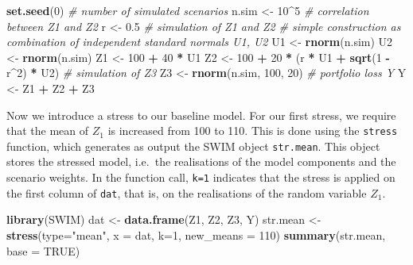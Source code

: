 \documentclass[]{article}
\newenvironment{Shaded}{\begin{snugshade}}{\end{snugshade}}
\newcommand{\CommentTok}[1]{\textcolor[rgb]{0.56,0.35,0.01}{\textit{#1}}}
\newcommand{\DataTypeTok}[1]{\textcolor[rgb]{0.13,0.29,0.53}{#1}}
\newcommand{\DecValTok}[1]{\textcolor[rgb]{0.00,0.00,0.81}{#1}}
\newcommand{\FloatTok}[1]{\textcolor[rgb]{0.00,0.00,0.81}{#1}}
\newcommand{\KeywordTok}[1]{\textcolor[rgb]{0.13,0.29,0.53}{\textbf{#1}}}
\newcommand{\NormalTok}[1]{#1}
\newcommand{\OperatorTok}[1]{\textcolor[rgb]{0.81,0.36,0.00}{\textbf{#1}}}
\newcommand{\OtherTok}[1]{\textcolor[rgb]{0.56,0.35,0.01}{#1}}
\newcommand{\StringTok}[1]{\textcolor[rgb]{0.31,0.60,0.02}{#1}}
\begin{document}
\begin{Shaded}
\begin{Highlighting}[]
\KeywordTok{set.seed}\NormalTok{(}\DecValTok{0}\NormalTok{)}
\CommentTok{# number of simulated scenarios}
\NormalTok{n.sim <-}\StringTok{ }\DecValTok{10}\OperatorTok{^}\DecValTok{5}
\CommentTok{# correlation between Z1 and Z2}
\NormalTok{r <-}\StringTok{ }\FloatTok{0.5}
\CommentTok{# simulation of Z1  and Z2}
\CommentTok{# simple construction as combination of independent standard normals U1, U2}
\NormalTok{U1 <-}\StringTok{ }\KeywordTok{rnorm}\NormalTok{(n.sim)}
\NormalTok{U2 <-}\StringTok{ }\KeywordTok{rnorm}\NormalTok{(n.sim)}
\NormalTok{Z1 <-}\StringTok{ }\DecValTok{100} \OperatorTok{+}\StringTok{ }\DecValTok{40} \OperatorTok{*}\StringTok{ }\NormalTok{U1}
\NormalTok{Z2 <-}\StringTok{ }\DecValTok{100} \OperatorTok{+}\StringTok{ }\DecValTok{20} \OperatorTok{*}\StringTok{ }\NormalTok{(r }\OperatorTok{*}\StringTok{ }\NormalTok{U1 }\OperatorTok{+}\StringTok{ }\KeywordTok{sqrt}\NormalTok{(}\DecValTok{1} \OperatorTok{-}\StringTok{ }\NormalTok{r}\OperatorTok{^}\DecValTok{2}\NormalTok{) }\OperatorTok{*}\StringTok{ }\NormalTok{U2)}
\CommentTok{# simulation of Z3}
\NormalTok{Z3 <-}\StringTok{ }\KeywordTok{rnorm}\NormalTok{(n.sim, }\DecValTok{100}\NormalTok{, }\DecValTok{20}\NormalTok{)}
\CommentTok{# portfolio loss Y}
\NormalTok{Y <-}\StringTok{ }\NormalTok{Z1 }\OperatorTok{+}\StringTok{ }\NormalTok{Z2 }\OperatorTok{+}\StringTok{ }\NormalTok{Z3}
\end{Highlighting}
\end{Shaded}

Now we introduce a stress to our baseline model. For our first stress, we require that the mean of \(Z_1\) is increased from 100 to 110. This is done using the \texttt{stress} function, which generates as output the SWIM object \texttt{str.mean}. This object stores the stressed model, i.e.~the realisations of the model components and the scenario weights. In the function call, \texttt{k=1} indicates that the stress is applied on the first column of \texttt{dat}, that is, on the realisations of the random variable \(Z_1\).

\begin{Shaded}
\begin{Highlighting}[]
\KeywordTok{library}\NormalTok{(SWIM)}
\NormalTok{dat <-}\StringTok{ }\KeywordTok{data.frame}\NormalTok{(Z1, Z2, Z3, Y)}
\NormalTok{str.mean <-}\StringTok{ }\KeywordTok{stress}\NormalTok{(}\DataTypeTok{type=}\StringTok{"mean"}\NormalTok{, }\DataTypeTok{x =}\NormalTok{ dat, }\DataTypeTok{k=}\DecValTok{1}\NormalTok{, }\DataTypeTok{new_means =} \DecValTok{110}\NormalTok{)}
\KeywordTok{summary}\NormalTok{(str.mean, }\DataTypeTok{base =} \OtherTok{TRUE}\NormalTok{)}
\end{Highlighting}
\end{Shaded}
\end{document}
